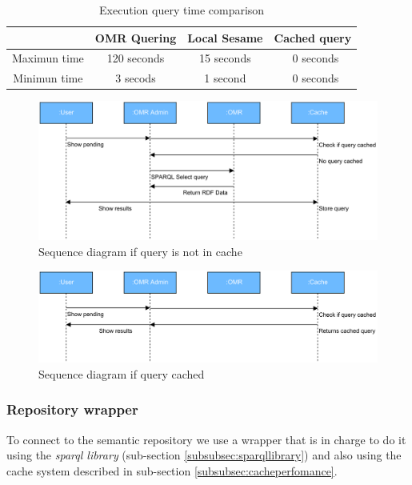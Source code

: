 \begin {table}[ht!]
\caption {Execution query time comparison} \label{tab:timecomp} 
\begin{center}
	\begin{tabular}{|c|c|c|c|}
		\hline              & OMR Quering & Local Sesame & Cached query \\ 
		\hline Maximun time & 120 seconds & 15 seconds   & ~0 seconds   \\ 
		\hline Minimun time & 3 secods    & 1 second     & ~0 seconds   \\ 
		\hline 
	\end{tabular}
\end{center}
\end{table}


\begin{figure}[h]
	\centering
	\includegraphics[width=350pt]{graphics/Diagrama_secuencia_cache_A.pdf}
	\caption{Sequence diagram if query is not in cache}
	\label{fig:cachesequence_a}
\end{figure}

\begin{figure}[h]
	\centering
	\includegraphics[width=350pt]{graphics/Diagrama_secuencia_cache_B.pdf}
	\caption{Sequence diagram if query cached}
	\label{fig:cachesequence_b}
\end{figure}
\FloatBarrier



\subsubsection{Repository wrapper}
To connect to the semantic repository we use a wrapper that is in charge to do it using the \textit{sparql library} (sub-section \ref{subsubsec:sparqllibrary}) and also using the cache system described in sub-section \ref{subsubsec:cacheperfomance}.

